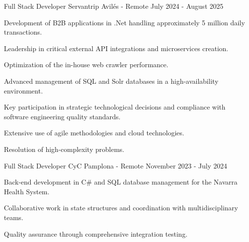 
\begin{cventries}
    \cventry
    {Full Stack Developer} %
    {Servantrip} %
    {Avilés - Remote} %
    {July 2024 - August 2025} %
    {
        \begin{cvitems} %
            \item {Development of B2B applications in .Net handling approximately 5 million daily transactions.}
            \item {Leadership in critical external API integrations and microservices creation.}
            \item {Optimization of the in-house web crawler performance.}
            \item {Advanced management of SQL and Solr databases in a high-availability environment.}
            \item {Key participation in strategic technological decisions and compliance with software engineering quality standards.}
            \item {Extensive use of agile methodologies and cloud technologies.}
            \item {Resolution of high-complexity problems.}
        \end{cvitems}
    }
    \cventry
    {Full Stack Developer} %
    {CyC} %
    {Pamplona - Remote} %
    {November 2023 - July 2024} %
    {
        \begin{cvitems}
            \item {Back-end development in C# and SQL database management for the Navarra Health System.}
            \item {Collaborative work in state structures and coordination with multidisciplinary teams.}
            \item {Quality assurance through comprehensive integration testing.}
        \end{cvitems}
    }

\end{cventries}
